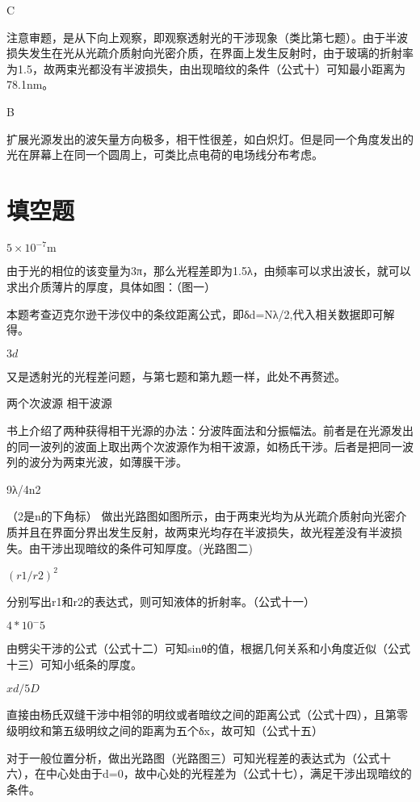 \exercise C

\solve 注意审题，是从下向上观察，即观察透射光的干涉现象（类比第七题）。由于半波损失发生在光从光疏介质射向光密介质，在界面上发生反射时，由于玻璃的折射率为1.5，故两束光都没有半波损失，由出现暗纹的条件（公式十）可知最小距离为78.1nm。

\exercise B

\solve 扩展光源发出的波矢量方向极多，相干性很差，如白炽灯。但是同一个角度发出的光在屏幕上在同一个圆周上，可类比点电荷的电场线分布考虑。
\section{填空题}
\exercise $5\times10^{-7}\mathrm{m}$ 

\solve 由于光的相位的该变量为3π，那么光程差即为1.5λ，由频率可以求出波长，就可以求出介质薄片的厚度，具体如图：（图一）


\solve 本题考查迈克尔逊干涉仪中的条纹距离公式，即δd=Nλ/2,代入相关数据即可解得。

\exercise $3d$

\solve  又是透射光的光程差问题，与第七题和第九题一样，此处不再赘述。

\exercise 两个次波源 \quad 相干波源 

\solve 书上介绍了两种获得相干光源的办法：分波阵面法和分振幅法。前者是在光源发出的同一波列的波面上取出两个次波源作为相干波源，如杨氏干涉。后者是把同一波列的波分为两束光波，如薄膜干涉。

\exercise 9λ/4n2

\solve （2是n的下角标） 做出光路图如图所示，由于两束光均为从光疏介质射向光密介质并且在界面分界出发生反射，故两束光均存在半波损失，故光程差没有半波损失。由干涉出现暗纹的条件可知厚度。(光路图二)

\exercise $(r1/r2)^2$

\solve 分别写出r1和r2的表达式，则可知液体的折射率。（公式十一）

\exercise $4*10^-5$

\solve 由劈尖干涉的公式（公式十二）可知sinθ的值，根据几何关系和小角度近似（公式十三）可知小纸条的厚度。

\exercise $xd/5D$

\solve 直接由杨氏双缝干涉中相邻的明纹或者暗纹之间的距离公式（公式十四），且第零级明纹和第五级明纹之间的距离为五个δx，故可知（公式十五）

\exercise 

\solve 对于一般位置分析，做出光路图（光路图三）可知光程差的表达式为（公式十六），在中心处由于d=0，故中心处的光程差为（公式十七），满足干涉出现暗纹的条件。

